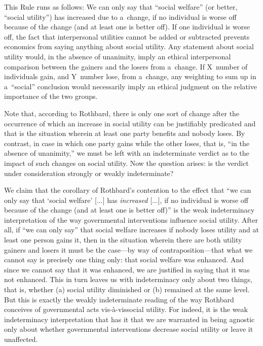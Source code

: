 This Rule runs as follows: We can only say that ``social welfare'' (or better, ``social utility'') has increased due to a~change, if no individual is worse off because of the change (and at least one is better off). If one individual is worse off, the fact that interpersonal utilities cannot be added or subtracted prevents economics from saying anything about social utility. Any statement about social utility would, in the absence of unanimity, imply an ethical interpersonal comparison between the gainers and the losers from a~change. If X~number of individuals gain, and Y~number lose, from a~change, any weighting to sum up in a~``social'' conclusion would necessarily imply an ethical judgment on the relative importance of the two groups. 
\parencite[][pp.244–245]{rothbard_toward_2008}%




Note that, according to Rothbard, there is only one sort of change after the occurrence of which an increase in social utility can be justifiably predicated and that is the situation wherein at least one party benefits and nobody loses. By contrast, in case in which one party gains while the other loses, that is, ``in the absence of unanimity,'' we must be left with an indeterminate verdict as to the impact of such changes on social utility. Now the question arises: is the verdict under consideration strongly or weakly indeterminate?



We claim that the corollary of Rothbard's contention to the effect that ``we can only say that ‘social welfare' [...] has \textit{increased} [...], if no individual is worse off because of the change (and at least one is better off)'' is the weak indeterminacy interpretation of the way governmental interventions influence social utility. After all, if ``we can only say'' that social welfare increases if nobody loses utility and at least one person gains it, then in the situation wherein there are both utility gainers and losers it must be the case---by way of contraposition---that what we cannot say is precisely one thing only: that social welfare was enhanced. And since we cannot say that it was enhanced, we are justified in saying that it was not enhanced. This in turn leaves us with indeterminacy only about two things, that is, whether (a) social utility diminished or (b) remained at the same level. But this is exactly the weakly indeterminate reading of the way Rothbard conceives of governmental acts vis-à-vis\textstyleEmphasis{\textbf{\textup{\textcolor[rgb]{0.37254903,0.3882353,0.40784314}{~}}}}social utility. For indeed, it is the weak indeterminacy interpretation that has it that we are warranted in being agnostic only about whether governmental interventions decrease social utility or leave it unaffected.



